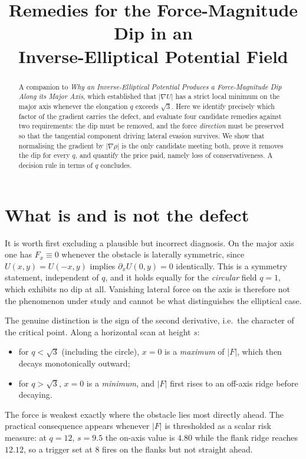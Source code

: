\documentclass[11pt]{article}
\title{Remedies for the Force-Magnitude Dip in an\\
       Inverse-Elliptical Potential Field}
\author{}
\date{}
\begin{document}
\maketitle

\begin{abstract}
A companion to \emph{Why an Inverse-Elliptical Potential Produces a
Force-Magnitude Dip Along its Major Axis}, which established that
$|\nabla U|$ has a strict local minimum on the major axis whenever the
elongation $q$ exceeds $\sqrt{3}$. Here we identify precisely which factor of
the gradient carries the defect, and evaluate four candidate remedies against
two requirements: the dip must be removed, and the force \emph{direction}
must be preserved so that the tangential component driving lateral evasion
survives. We show that normalising the gradient by $|\nabla\rho|$ is the only
candidate meeting both, prove it removes the dip for every $q$, and quantify
the price paid, namely loss of conservativeness. A decision rule in terms of
$q$ concludes.
\end{abstract}

\section{What is and is not the defect}
\label{sec:defect}

It is worth first excluding a plausible but incorrect diagnosis. On the major
axis one has $F_{x}\equiv0$ whenever the obstacle is laterally symmetric, since
$U(x,y)=U(-x,y)$ implies $\partial_{x}U(0,y)=0$ identically. This is a
symmetry statement, independent of $q$, and it holds equally for the
\emph{circular} field $q=1$, which exhibits no dip at all. Vanishing lateral
force on the axis is therefore not the phenomenon under study and cannot be
what distinguishes the elliptical case.

The genuine distinction is the sign of the second derivative, i.e.\ the
character of the critical point. Along a horizontal scan at height $s$:
\begin{itemize}
  \item for $q<\sqrt{3}$ (including the circle), $x=0$ is a \emph{maximum} of
        $|F|$, which then decays monotonically outward;
  \item for $q>\sqrt{3}$, $x=0$ is a \emph{minimum}, and $|F|$ first rises to
        an off-axis ridge before decaying.
\end{itemize}
The force is weakest exactly where the obstacle lies most directly ahead. The
practical consequence appears whenever $|F|$ is thresholded as a scalar risk
measure: at $q=12$, $s=9.5$ the on-axis value is $4.80$ while the flank ridge
reaches $12.12$, so a trigger set at $8$ fires on the flanks but not straight
ahead.
\end{document}
